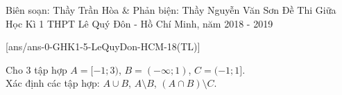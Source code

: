 \begin{name}
{Biên soạn: Thầy Trần Hòa \& Phản biện: Thầy Nguyễn Văn Sơn}
{Đề Thi Giữa Học Kì 1 THPT Lê Quý Đôn - Hồ Chí Minh, năm 2018 - 2019}
\end{name}

\setcounter{ex}{0}\setcounter{bt}{0}
[ans/ans-0-GHK1-5-LeQuyDon-HCM-18(TL)]
\begin{bt}%
	Cho $3$ tập hợp $A=[-1;3)$, $B=(-\infty;1)$, $C=(-1;1]$.\\
	Xác định các tập hợp: $A\cup B$, $A\setminus B$, $\left(A\cap B\right)\setminus C$.
	\loigiai{
	\begin{itemize}
         \item $A\cup B=(-\infty;3)$.
         \item $A\setminus B=[1;3)$.
         \item  $\left(A\cap B\right)=[-1;1)\Rightarrow \left(A\cap B\right)\setminus C=\{-1\}$.
         \end{itemize}	
	}
\end{bt}
